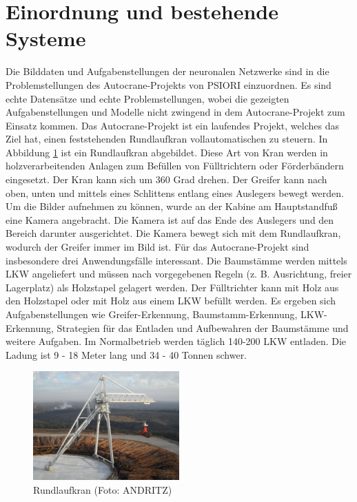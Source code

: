 	\section{Einordnung und bestehende Systeme}
	\label{sec:BestehendesSystem}
	Die Bilddaten und Aufgabenstellungen der neuronalen Netzwerke sind in die Problemstellungen des Autocrane-Projekts \cite{PSIORIGmbH.2020} von PSIORI einzuordnen. Es sind echte Datensätze und echte Problemstellungen, wobei die gezeigten Aufgabenstellungen und Modelle nicht zwingend in dem Autocrane-Projekt zum Einsatz kommen. Das Autocrane-Projekt ist ein laufendes Projekt, welches das Ziel hat, einen feststehenden Rundlaufkran vollautomatischen zu steuern. In Abbildung \ref{img:CircularCrane} ist ein Rundlaufkran abgebildet. Diese Art von Kran werden in holzverarbeitenden Anlagen zum Befüllen von Fülltrichtern oder Förderbändern eingesetzt. Der Kran kann sich um 360 Grad drehen. Der Greifer kann nach oben, unten und mittels eines Schlittens entlang eines Auslegers bewegt werden. Um die Bilder aufnehmen zu können, wurde an der Kabine am Hauptstandfuß eine Kamera angebracht. Die Kamera ist auf das Ende des Auslegers und den Bereich darunter ausgerichtet. Die Kamera bewegt sich mit dem Rundlaufkran, wodurch der Greifer immer im Bild ist. Für das Autocrane-Projekt sind insbesondere drei Anwendungsfälle interessant. Die Baumstämme werden mittels LKW angeliefert und müssen nach vorgegebenen Regeln (z. B. Ausrichtung, freier Lagerplatz) als Holzstapel gelagert werden. Der Fülltrichter kann mit Holz aus den Holzstapel oder mit Holz aus einem LKW befüllt werden. Es ergeben sich Aufgabenstellungen wie Greifer-Erkennung, Baumstamm-Erkennung, LKW-Erkennung, Strategien für das Entladen und Aufbewahren der Baumstämme und weitere Aufgaben. Im Normalbetrieb werden täglich 140-200 LKW entladen. Die Ladung ist 9 - 18 Meter lang und 34 - 40 Tonnen schwer. 
	\begin{figure}[h]
		\centering
		\includegraphics[width=0.5\textwidth, center]{bilder/Grundlagen/Kran_vollstaendig_N1_030.jpg}
		\caption[Rundlaufkran]{Rundlaufkran (Foto: ANDRITZ)}
		\label{img:CircularCrane}
	\end{figure}		

